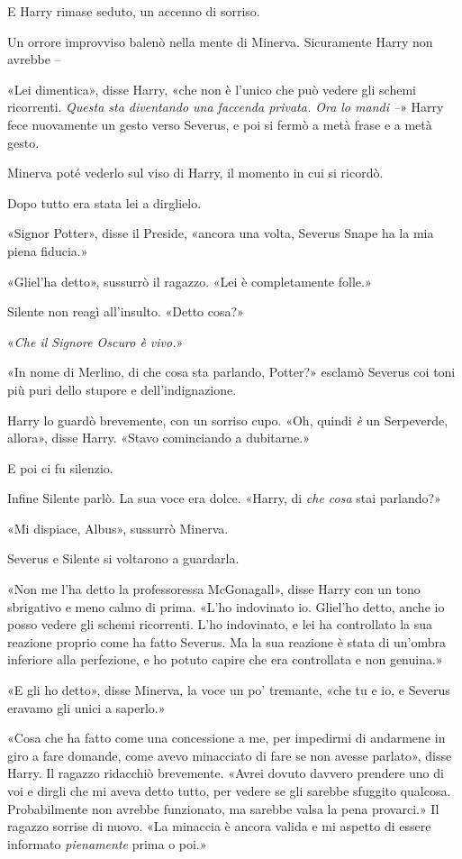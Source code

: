 E Harry rimase seduto, un accenno di sorriso.

Un orrore improvviso balenò nella mente di Minerva. Sicuramente Harry non avrebbe –

«Lei dimentica», disse Harry, «che non è l’unico che può vedere gli schemi ricorrenti. \textit{Questa sta diventando una faccenda privata. Ora lo mandi –}» Harry fece nuovamente un gesto verso Severus, e poi si fermò a metà frase e a metà gesto.

Minerva poté vederlo sul viso di Harry, il momento in cui si ricordò.

Dopo tutto era stata lei a dirglielo.

«Signor Potter», disse il Preside, «ancora una volta, Severus Snape ha la mia piena fiducia.»

«Gliel’ha detto», sussurrò il ragazzo. «Lei è completamente folle.»

Silente non reagì all’insulto. «Detto cosa?»

«\textit{Che il Signore Oscuro è vivo.}»

«In nome di Merlino, di che cosa sta parlando, Potter?» esclamò Severus coi toni più puri dello stupore e dell’indignazione.

Harry lo guardò brevemente, con un sorriso cupo. «Oh, quindi \textit{è} un Serpeverde, allora», disse Harry. «Stavo cominciando a dubitarne.»

E poi ci fu silenzio.

Infine Silente parlò. La sua voce era dolce. «Harry, di \textit{che cosa} stai parlando?»

«Mi dispiace, Albus», sussurrò Minerva.

Severus e Silente si voltarono a guardarla.

«Non me l’ha detto la professoressa McGonagall», disse Harry con un tono sbrigativo e meno calmo di prima. «L’ho indovinato io. Gliel’ho detto, anche io posso vedere gli schemi ricorrenti. L’ho indovinato, e lei ha controllato la sua reazione proprio come ha fatto Severus. Ma la sua reazione è stata di un’ombra inferiore alla perfezione, e ho potuto capire che era controllata e non genuina.»

«E gli ho detto», disse Minerva, la voce un po’ tremante, «che tu e io, e Severus eravamo gli unici a saperlo.»

«Cosa che ha fatto come una concessione a me, per impedirmi di andarmene in giro a fare domande, come avevo minacciato di fare se non avesse parlato», disse Harry. Il ragazzo ridacchiò brevemente. «Avrei dovuto davvero prendere uno di voi e dirgli che mi aveva detto tutto, per vedere se gli sarebbe sfuggito qualcosa. Probabilmente non avrebbe funzionato, ma sarebbe valsa la pena provarci.» Il ragazzo sorrise di nuovo. «La minaccia è ancora valida e mi aspetto di essere informato \textit{pienamente} prima o poi.»

